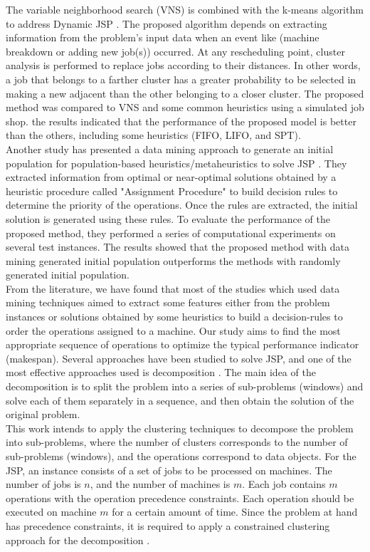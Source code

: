 \documentclass{article}
\begin{document}
The variable neighborhood search (VNS) is combined with the k-means algorithm to address Dynamic JSP \cite{adibi2014clustering}. The proposed algorithm depends on extracting information from the problem's input data when an event like (machine breakdown or adding new job(s)) occurred. At any rescheduling point, cluster analysis is performed to replace jobs according to their distances. In other words, a job that belongs to a farther cluster has a greater probability to be selected in making a new adjacent than the other belonging to a closer cluster. The proposed method was compared to VNS and some common heuristics using a simulated job shop. the results indicated that the performance of the proposed model is better than the others, including some heuristics (FIFO, LIFO, and SPT).\\

Another study has presented a data mining approach to generate an initial population for population-based heuristics/metaheuristics to solve JSP \cite{nasiri2019data}. They extracted information from optimal or near-optimal solutions obtained by a heuristic procedure called "Assignment Procedure" to build decision rules to determine the priority of the operations. Once the rules are extracted, the initial solution is generated using these rules. To evaluate the performance of the proposed method, they performed a series of computational experiments on several test instances. The results showed that the proposed method with data mining generated initial population outperforms the methods with randomly generated initial population.\\

From the literature, we have found that most of the studies which used data mining techniques aimed to extract some features either from the problem instances or solutions obtained by some heuristics to build a decision-rules to order the operations assigned to a machine. Our study aims to  find the most appropriate sequence of operations to optimize the typical performance indicator (makespan). Several approaches have been studied to solve JSP, and one of the most effective approaches used is decomposition \cite{zhang2010hybrid,zhai2014decomposition}. The main idea of the decomposition is to split the problem into a series of sub-problems (windows) and solve each of them separately in a sequence, and then obtain the solution of the original problem.\\

This work intends to apply the clustering techniques to decompose the problem into sub-problems, where the number of clusters corresponds to the number of sub-problems (windows), and the operations correspond to data objects. For the JSP, an instance consists of a set of jobs to be processed on machines. The number of jobs is $n$, and the number of machines is $m$. Each job contains $m$ operations with the operation precedence constraints. Each operation should be executed on machine $m$ for a certain amount of time. Since the problem at hand has precedence constraints, it is required to apply a constrained clustering approach for the decomposition \cite{wagstaff2001constrained}.\\
\end{document}
